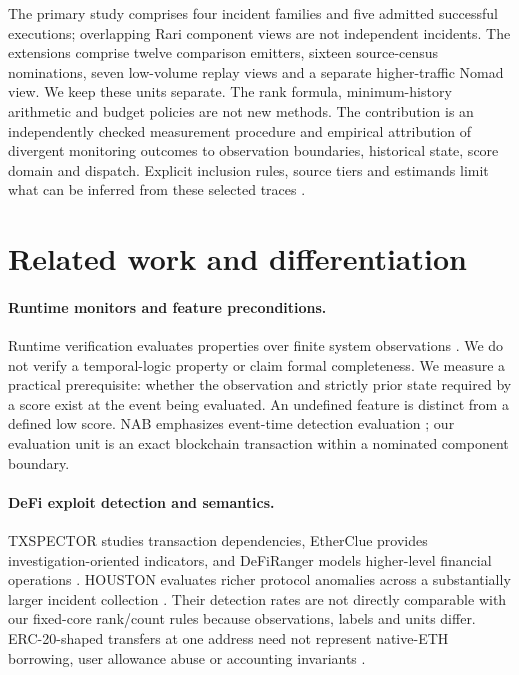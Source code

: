 \documentclass[preprint,12pt,authoryear]{elsarticle}
\begin{document}
The primary study comprises four incident families and five admitted successful executions; overlapping Rari component views are not independent incidents. The extensions comprise twelve comparison emitters, sixteen source-census nominations, seven low-volume replay views and a separate higher-traffic Nomad view. We keep these units separate. The rank formula, minimum-history arithmetic and budget policies are not new methods. The contribution is an independently checked measurement procedure and empirical attribution of divergent monitoring outcomes to observation boundaries, historical state, score domain and dispatch. Explicit inclusion rules, source tiers and estimands limit what can be inferred from these selected traces \citep{Kitchenham2004Evidence,Wohlin2012Experimentation}.

\section{Related work and differentiation}\label{sec:related}
\paragraph{Runtime monitors and feature preconditions.} Runtime verification evaluates properties over finite system observations \citep{Leucker2009RV,Bauer2011RV}. We do not verify a temporal-logic property or claim formal completeness. We measure a practical prerequisite: whether the observation and strictly prior state required by a score exist at the event being evaluated. An undefined feature is distinct from a defined low score. NAB emphasizes event-time detection evaluation \citep{Lavin2015NAB}; our evaluation unit is an exact blockchain transaction within a nominated component boundary.

\paragraph{DeFi exploit detection and semantics.} TXSPECTOR studies transaction dependencies, EtherClue provides investigation-oriented indicators, and DeFiRanger models higher-level financial operations \citep{Zhang2020TxSpector,Aquilina2021EtherClue,Wu2024DeFiRanger}. HOUSTON evaluates richer protocol anomalies across a substantially larger incident collection \citep{Meng2026Houston}. Their detection rates are not directly comparable with our fixed-core rank/count rules because observations, labels and units differ. ERC-20-shaped transfers at one address need not represent native-ETH borrowing, user allowance abuse or accounting invariants \citep{Vogelsteller2015ERC20,Revest2022Postmortem,Rari2022Postmortem}.
\end{document}
